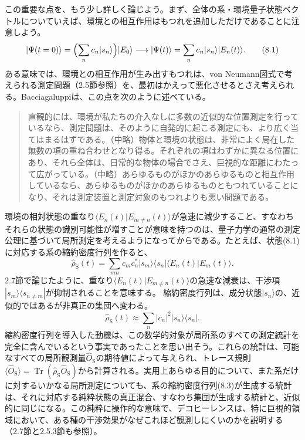 この重要な点を、もう少し詳しく論じよう。まず、全体の系・環境量子状態ベクトルについていえば、環境との相互作用はもつれを追加しただけであることに注意しよう。
\begin{equation}
|\Psi(t=0)\rangle=\Bigl(\sum_n c_n|s_n\rangle\Bigr)|E_0\rangle
\longrightarrow |\Psi(t)\rangle=\sum_n c_n|s_n\rangle|E_n(t)\rangle .\tag{8.1}
\end{equation}
ある意味では、環境との相互作用が生み出すもつれは、von Neumann図式で考えられる測定問題（2.5節参照）を、最初はかえって悪化させるとさえ考えられる。Bacciagaluppi\cite[3.2節]{ref391}は、この点を次のように述べている。
\begin{quote}
直観的には、環境が私たちの介入なしに多数の近似的な位置測定を行っているなら、測定問題は、そのように自発的に起こる測定にも、より広く当てはまるはずである。（中略）物体と環境の状態は、非常によく局在した無数の項の重ね合わせとなり得る。それぞれの項はわずかに異なる位置にあり、それら全体は、日常的な物体の場合でさえ、巨視的な距離にわたって広がっている。（中略）あらゆるものがほかのあらゆるものと相互作用しているなら、あらゆるものがほかのあらゆるものともつれていることになり、それは測定装置と測定対象のもつれよりも悪い問題である。
\end{quote}
環境の相対状態の重なり$\langle E_n(t)|E_{m\ne n}(t)\rangle$が急速に減少すること、すなわちそれらの状態の識別可能性が増すことが意味を持つのは、量子力学の通常の測定公理に基づいて局所測定を考えるようになってからである。たとえば、状態(8.1)に対応する系の縮約密度行列を作ると、
\begin{equation}
\hat\rho_{\mathrm S}(t)=\sum_{mn}c_m c_n^*|s_m\rangle\langle s_n|\langle E_n(t)|E_m(t)\rangle .\tag{8.2}
\end{equation}
2.7節で論じたように、重なり$\langle E_n(t)|E_{m\ne n}(t)\rangle$の急速な減衰は、干渉項$|s_m\rangle\langle s_{n\ne m}|$が抑制されることを意味する。
\hypertarget{srcpage:333}{}\label{srcpage:333}
縮約密度行列は、成分状態$|s_n\rangle$の、近似的ではあるが非真正の集団へ変わる。
\begin{equation}
\hat\rho_{\mathrm S}(t)\approx\sum_n|c_n|^2|s_n\rangle\langle s_n| .\tag{8.3}
\end{equation}
縮約密度行列を導入した動機は、この数学的対象が局所系のすべての測定統計を完全に含んでいるという事実であったことを思い出そう。これらの統計は、可能なすべての局所観測量$\hat O_{\mathrm S}$の期待値によって与えられ、トレース規則$\langle\hat O_{\mathrm S}\rangle=\operatorname{Tr}(\hat\rho_{\mathrm S}\hat O_{\mathrm S})$から計算される。実用上あらゆる目的について、また系だけに対するいかなる局所測定についても、系の縮約密度行列(8.3)が生成する統計は、それに対応する純粋状態の真正混合、すなわち集団が生成する統計と、近似的に同じになる。この純粋に操作的な意味で、デコヒーレンスは、特に巨視的領域において、ある種の干渉効果がなぜこれほど観測しにくいのかを説明する（2.7節と2.5.3節も参照）。

